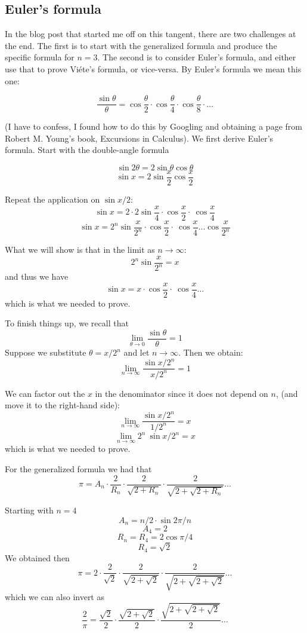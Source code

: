 \documentclass[11pt, oneside]{article}
\begin{document}
\subsection*{Euler's formula}
In the blog post that started me off on this tangent, there are two challenges at the end.  The first is to start with the generalized formula and produce the specific formula for $n=3$.  The second is to consider Euler's formula, and either use that to prove Vi\'ete's formula, or vice-versa.  By Euler's formula we mean this one:

\[ \frac{\sin \theta}{\theta} = \cos \frac{\theta}{2} \cdot \cos \frac{\theta}{4} \cdot \cos \frac{\theta}{8} \cdot \dots \]

(I have to confess, I found how to do this by Googling and obtaining a page from Robert M. Young's book, Excursions in Calculus).  We first derive Euler's formula.  Start with the double-angle formula

\[ \sin 2 \theta = 2 \sin \theta \cos \theta \]
\[ \sin x = 2 \sin \frac{x}{2} \cos \frac{x}{2} \]

Repeat the application on $\sin x/2$:
\[ \sin x = 2 \cdot 2 \sin \frac{x}{4} \cdot \cos \frac{x}{2} \cdot \ \cos \frac{x}{4} \]
\[ \sin x = 2^n \sin \frac{x}{2^n} \cdot \cos \frac{x}{2} \cdot \ \cos \frac{x}{4} \dots \cos \frac{x}{2^n}  \]

What we will show is that in the limit as $n \rightarrow \infty$:
\[ 2^n \sin \frac{x}{2^n} = x \]
and thus we have
\[ \sin x = x \cdot \cos \frac{x}{2} \cdot \ \cos \frac{x}{4} \dots  \]
which is what we needed to prove.

To finish things up, we recall that
\[ \lim_{\theta \rightarrow 0} \frac{\sin \theta}{\theta} = 1 \]
Suppose we substitute $\theta = x/2^n$ and let $n \rightarrow \infty$.  Then we obtain:
\[ \lim_{n \rightarrow \infty} \frac{\sin x/2^n}{x/2^n} = 1 \]

We can factor out the $x$ in the denominator since it does not depend on $n$,  (and move it to the right-hand side):
\[ \lim_{n \rightarrow \infty} \frac{\sin x/2^n}{1/2^n} = x \]
\[ \lim_{n \rightarrow \infty} 2^n \ \sin x/2^n = x \]
which is what we needed to prove.

For the generalized formula we had that 
\[ \pi = A_n \cdot \frac{2}{R_n} \cdot \frac{2}{\sqrt{2 + R_n}} \cdot \frac{2}{\sqrt{2 + \sqrt{2 + R_n}}}  \dots \]

Starting with $n=4$
\[ A_n = n/2 \cdot \sin 2 \pi/n \]
\[ A_4 = 2  \]
\[ R_n = R_4 =  2 \cos \pi/4 \]
\[ R_4 = \sqrt{2} \]
We obtained then
\[ \pi = 2 \cdot \frac{2}{\sqrt{2}} \cdot \frac{2}{\sqrt{2 + \sqrt{2}}} \cdot \frac{2}{\sqrt{2 + \sqrt{2 + \sqrt{2}}}} \dots \]
which we can also invert as
\[ \frac{2}{\pi} = \frac{\sqrt{2}}{2} \cdot \frac{\sqrt{2 + \sqrt{2}}}{2} \cdot \frac{\sqrt{2 + \sqrt{2 + \sqrt{2}}}}{2} \dots \]
\end{document}
